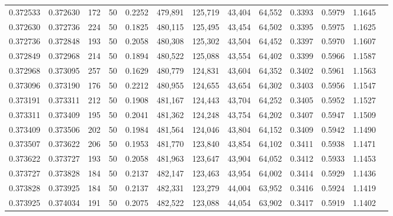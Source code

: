 \begin{tabular}{rrrrrrrrrrrrr}
0.372533 & 0.372630 &   172 &  50 &                                     0.2252 & 479,891 & 125,719 &  43,404 &  64,552 & 0.3393 & 0.5979 & 1.1645 \\
0.372630 & 0.372736 &   224 &  50 &                                     0.1825 & 480,115 & 125,495 &  43,454 &  64,502 & 0.3395 & 0.5975 & 1.1625 \\
0.372736 & 0.372848 &   193 &  50 &                                     0.2058 & 480,308 & 125,302 &  43,504 &  64,452 & 0.3397 & 0.5970 & 1.1607 \\
0.372849 & 0.372968 &   214 &  50 &                                     0.1894 & 480,522 & 125,088 &  43,554 &  64,402 & 0.3399 & 0.5966 & 1.1587 \\
0.372968 & 0.373095 &   257 &  50 &                                     0.1629 & 480,779 & 124,831 &  43,604 &  64,352 & 0.3402 & 0.5961 & 1.1563 \\
0.373096 & 0.373190 &   176 &  50 &                                     0.2212 & 480,955 & 124,655 &  43,654 &  64,302 & 0.3403 & 0.5956 & 1.1547 \\
0.373191 & 0.373311 &   212 &  50 &                                     0.1908 & 481,167 & 124,443 &  43,704 &  64,252 & 0.3405 & 0.5952 & 1.1527 \\
0.373311 & 0.373409 &   195 &  50 &                                     0.2041 & 481,362 & 124,248 &  43,754 &  64,202 & 0.3407 & 0.5947 & 1.1509 \\
0.373409 & 0.373506 &   202 &  50 &                                     0.1984 & 481,564 & 124,046 &  43,804 &  64,152 & 0.3409 & 0.5942 & 1.1490 \\
0.373507 & 0.373622 &   206 &  50 &                                     0.1953 & 481,770 & 123,840 &  43,854 &  64,102 & 0.3411 & 0.5938 & 1.1471 \\
0.373622 & 0.373727 &   193 &  50 &                                     0.2058 & 481,963 & 123,647 &  43,904 &  64,052 & 0.3412 & 0.5933 & 1.1453 \\
0.373727 & 0.373828 &   184 &  50 &                                     0.2137 & 482,147 & 123,463 &  43,954 &  64,002 & 0.3414 & 0.5929 & 1.1436 \\
0.373828 & 0.373925 &   184 &  50 &                                     0.2137 & 482,331 & 123,279 &  44,004 &  63,952 & 0.3416 & 0.5924 & 1.1419 \\
0.373925 & 0.374034 &   191 &  50 &                                     0.2075 & 482,522 & 123,088 &  44,054 &  63,902 & 0.3417 & 0.5919 & 1.1402 \\

\end{tabular}
